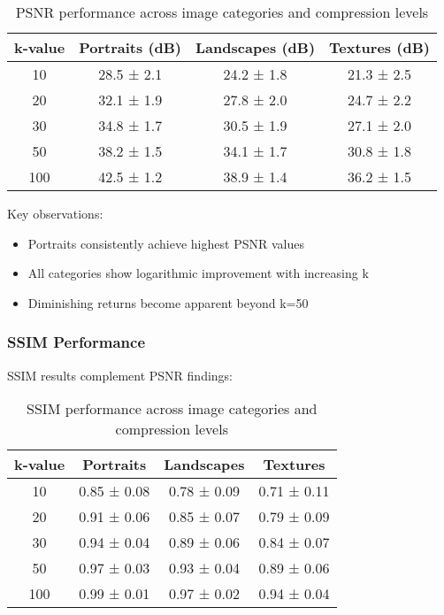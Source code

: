 \documentclass[12pt,a4paper]{article}
\begin{document}
\begin{table}[H]
\centering
\begin{tabular}{@{}cccc@{}}
\toprule
k-value & Portraits (dB) & Landscapes (dB) & Textures (dB) \\
\midrule
10 & 28.5 ± 2.1 & 24.2 ± 1.8 & 21.3 ± 2.5 \\
20 & 32.1 ± 1.9 & 27.8 ± 2.0 & 24.7 ± 2.2 \\
30 & 34.8 ± 1.7 & 30.5 ± 1.9 & 27.1 ± 2.0 \\
50 & 38.2 ± 1.5 & 34.1 ± 1.7 & 30.8 ± 1.8 \\
100 & 42.5 ± 1.2 & 38.9 ± 1.4 & 36.2 ± 1.5 \\
\bottomrule
\end{tabular}
\caption{PSNR performance across image categories and compression levels}
\label{tab:psnr_results}
\end{table}

Key observations:
\begin{itemize}
    \item Portraits consistently achieve highest PSNR values
    \item All categories show logarithmic improvement with increasing k
    \item Diminishing returns become apparent beyond k=50
\end{itemize}

\subsubsection{SSIM Performance}

SSIM results complement PSNR findings:

\begin{table}[H]
\centering
\begin{tabular}{@{}cccc@{}}
\toprule
k-value & Portraits & Landscapes & Textures \\
\midrule
10 & 0.85 ± 0.08 & 0.78 ± 0.09 & 0.71 ± 0.11 \\
20 & 0.91 ± 0.06 & 0.85 ± 0.07 & 0.79 ± 0.09 \\
30 & 0.94 ± 0.04 & 0.89 ± 0.06 & 0.84 ± 0.07 \\
50 & 0.97 ± 0.03 & 0.93 ± 0.04 & 0.89 ± 0.06 \\
100 & 0.99 ± 0.01 & 0.97 ± 0.02 & 0.94 ± 0.04 \\
\bottomrule
\end{tabular}
\caption{SSIM performance across image categories and compression levels}
\label{tab:ssim_results}
\end{table}
\end{document}
